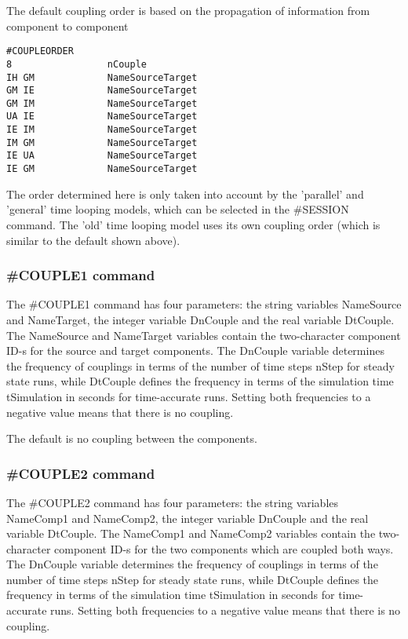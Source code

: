 The default coupling order is based on the propagation of information
from component to component
\begin{verbatim}
#COUPLEORDER
8                 nCouple
IH GM             NameSourceTarget
GM IE             NameSourceTarget
GM IM             NameSourceTarget
UA IE             NameSourceTarget
IE IM             NameSourceTarget
IM GM             NameSourceTarget
IE UA             NameSourceTarget
IE GM             NameSourceTarget
\end{verbatim}
The order determined here is only taken into account by the 'parallel'
and 'general' time looping models, which can be selected in
the \#SESSION command. The 'old' time looping model uses its own
coupling order (which is similar to the default shown above).

\subsubsection{\#COUPLE1 command}

The \#COUPLE1 command has four parameters: the string variables
NameSource and NameTarget, the integer variable DnCouple
and the real variable DtCouple. The NameSource and NameTarget 
variables contain the two-character component ID-s for the source
and target components. The DnCouple variable determines the frequency
of couplings in terms of the number of time steps nStep for steady state
runs, while DtCouple defines the frequency in terms of the simulation
time tSimulation in seconds for time-accurate runs. Setting both
frequencies to a negative value means that there is no coupling.

The default is no coupling between the components.

\subsubsection{\#COUPLE2 command}

The \#COUPLE2 command has four parameters: the string variables
NameComp1 and NameComp2, the integer variable DnCouple
and the real variable DtCouple. The NameComp1 and NameComp2 
variables contain the two-character component ID-s for the two
components which are coupled both ways. 
The DnCouple variable determines the frequency
of couplings in terms of the number of time steps nStep for steady state
runs, while DtCouple defines the frequency in terms of the simulation
time tSimulation in seconds for time-accurate runs. Setting both
frequencies to a negative value means that there is no coupling.

